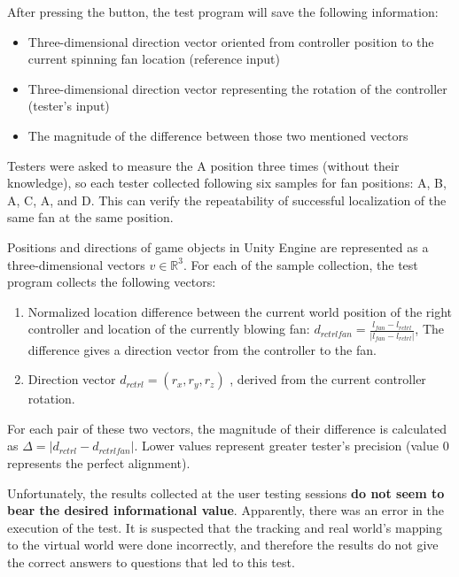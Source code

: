 \pagebreak

After pressing the button, the test program will save the following information:

\begin{itemize}
    \itemsep0em
\item Three-dimensional direction vector oriented from controller position to
the current spinning fan location (reference input)
\item Three-dimensional direction vector representing the rotation of the
controller (tester’s input)
\item The magnitude of the difference between those two mentioned vectors
\end{itemize}

Testers were asked to measure the A position three times (without their knowledge),
so each tester collected following six samples for fan positions: A, B, A, C,
A, and D. This can verify the repeatability of successful
localization of the same fan at the same position.

Positions and directions of game objects in Unity Engine are represented as 
a three-dimensional vectors \( v \in \mathbb{R}^3 \). For each of the sample collection, 
the test program collects the following vectors:

\begin{enumerate}
\item{Normalized location difference between the current world position of the right
controller and location of the currently blowing fan:
\( d_{rctrlfan} = \frac{l_{fan} - l_{rctrl}}{|l_{fan} - l_{rctrl}|} \),
 The difference gives a direction vector from the controller to the fan.}
\item{Direction vector \( d_{rctrl} = (r_x, r_y, r_z) \) , derived from the current controller rotation.}
\end{enumerate}

For each pair of these two vectors, the magnitude of their difference is calculated
as \( \Delta = | d_{rctrl} - d_{rctrlfan} | \).
Lower values represent greater tester’s precision (value \( 0 \) represents the 
perfect alignment).


Unfortunately, the results collected at the user testing sessions
\textbf{do not seem to bear the desired informational value}.
Apparently, there was an error in the execution of the test. It is suspected that
the tracking and real world’s mapping to the virtual world were done
incorrectly, and therefore the results do not give the correct answers to
questions that led to this test.

